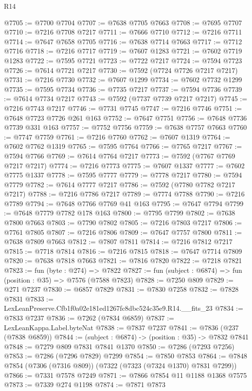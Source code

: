 \begin{lexlean}{R14}
\begin{coremodule}
@7705 := @7700 @7704
@7707 := @7638 @7705 @7663
@7708 := @7695 @7707
@7710 := @7216 @7708 @7217
@7711 := @7666 @7710
@7712 := @7216 @7711
@7714 := @7647 @7658 @7705
@7716 := @7638 @7714 @7663
@7717 := @7712 @7716
@7718 := @7216 @7717
@7719 := @7607 @1283
@7721 := @7602 @7719 @1283
@7722 := @7595 @7721
@7723 := @7722 @7217
@7724 := @7594 @7723
@7726 := @7614 @7721 @7217
@7730 := @7592 (@7724 @7726 @7217 @7217)
@7731 := @7216 @7730
@7732 := @7607 @1299
@7734 := @7602 @7732 @1299
@7735 := @7595 @7734
@7736 := @7735 @7217
@7737 := @7594 @7736
@7739 := @7614 @7734 @7217
@7743 := @7592 (@7737 @7739 @7217 @7217)
@7745 := @7216 @7743 @7217
@7746 := @7731 @7745
@7747 := @7216 @7746
@7751 := @7648 @7723 @7726 @261 @163
@7752 := @7647 @7751
@7756 := @7648 @7736 @7739 @331 @163
@7757 := @7752 @7756
@7759 := @7638 @7757 @7663
@7760 := @7747 @7759
@7761 := @7216 @7760
@7762 := @7607 @1319
@7764 := @7602 @7762 @1319
@7765 := @7595 @7764
@7766 := @7765 @7217
@7767 := @7594 @7766
@7769 := @7614 @7764 @7217
@7773 := @7592 (@7767 @7769 @7217 @7217)
@7774 := @7216 @7773
@7775 := @7607 @1337
@7777 := @7602 @7775 @1337
@7778 := @7595 @7777
@7779 := @7778 @7217
@7780 := @7594 @7779
@7782 := @7614 @7777 @7217
@7786 := @7592 (@7780 @7782 @7217 @7217)
@7788 := @7216 @7786 @7217
@7789 := @7774 @7788
@7790 := @7216 @7789
@7794 := @7648 @7766 @7769 @41 @163
@7795 := @7647 @7794
@7799 := @7648 @7779 @7782 @178 @163
@7800 := @7795 @7799
@7802 := @7638 @7800 @7663
@7803 := @7790 @7802
@7805 := @7216 @7803 @7217
@7806 := @7761 @7805
@7807 := @7216 @7806
@7809 := @7647 @7757 @7800
@7811 := @7638 @7809 @7663
@7812 := @7807 @7811
@7814 := @7216 @7812 @7217
@7815 := @7718 @7814
@7816 := @7216 @7815
@7818 := @7647 @7714 @7809
@7820 := @7638 @7818 @7663
@7821 := @7816 @7820
@7822 := @7218 @7821
@7823 := fun (byte : @274) => @7822
@7827 := fun (subject : @6874) => fun (position : @35) => @7576 (@7588 @7823)
@7828 := @7250 @809
@7829 := @271 @7237
@7830 := @6857 @7829
@7831 := @7830 @7258
@7832 := @7828 @7831
@7833 := LexLeanPreserve.Cfb1f0a02e181ed1267fc8dbc524c35e9.R14.__fits_23
@7834 := @7833 @7237
@7836 := @7262 (@7834 @6859)
@7837 := LexLeanKappa.Label.byteNat
@7838 := @7837 @7237
@7841 := @7836 (@237 (@7838 @6859))
@7844 := (subject : @6874) -> (position : @35) -> @7832 @7841
@7848 := @7279 @809 @7831 @7841 @1370
@7850 := @7286 (@7293 @7256)
@7853 := @7286 (@7296 @7829) @7299
@7854 := @7850 @7853
@7864 := @7848 @7854 (@7306 (@7316 @809)) (@7322 (@7323 (@7324 @1370) @7831 @7299))
@7866 := @7331 @7578 @7249
@7871 := @7866 @7854 @11 @1188 @1368 @7575
@7873 := @7339 @274 @1198
@7874 := @7871 @7873

\end{coremodule}
\end{lexlean}
